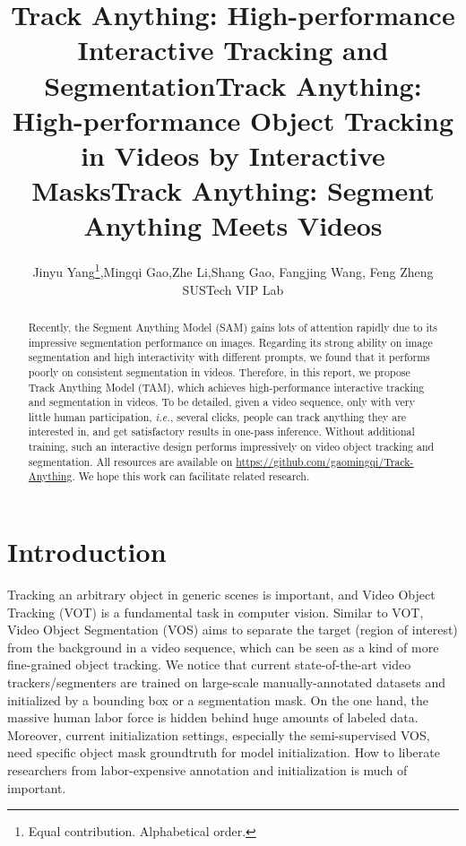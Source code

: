 \documentclass{article}
\title{Track Anything: High-performance Interactive Tracking and Segmentation}
\title{Track Anything: High-performance Object Tracking in Videos by Interactive Masks}
\title{Track Anything: Segment Anything Meets Videos}
\author{%
  Jinyu Yang\thanks{Equal contribution. Alphabetical order.},\enskip Mingqi Gao\footnotemark[1],\enskip Zhe Li\footnotemark[1],\enskip Shang Gao, Fangjing Wang, Feng Zheng \\
  SUSTech VIP Lab\\
}
\begin{document}
\maketitle


\begin{abstract}

Recently, the Segment Anything Model (SAM) gains lots of attention rapidly due to its impressive segmentation performance on images.
Regarding its strong ability on image segmentation and high interactivity with different prompts, we found that it performs poorly on consistent segmentation in videos.
Therefore, in this report, we propose Track Anything Model (TAM), which achieves high-performance interactive tracking and segmentation in videos.
To be detailed, given a video sequence, only with very little human participation, \textit{i.e.}, several clicks, people can track anything they are interested in, and get satisfactory results in one-pass inference.
Without additional training, such an interactive design performs impressively on video object tracking and segmentation.
All resources are available on \url{https://github.com/gaomingqi/Track-Anything}.
We hope this work can facilitate related research.

\end{abstract}

\section{Introduction}

Tracking an arbitrary object in generic scenes is important, and Video Object Tracking (VOT) is a fundamental task in computer vision.
Similar to VOT, Video Object Segmentation (VOS) aims to separate the target (region of interest) from the background in a video sequence, which can be seen as a kind of more fine-grained object tracking.
We notice that current state-of-the-art video trackers/segmenters are trained on large-scale manually-annotated datasets and initialized by a bounding box or a segmentation mask.
On the one hand, the massive human labor force is hidden behind huge amounts of labeled data.
Moreover, current initialization settings, especially the semi-supervised VOS, need specific object mask groundtruth for model initialization.
How to liberate researchers from labor-expensive annotation and initialization is much of important.
\end{document}
